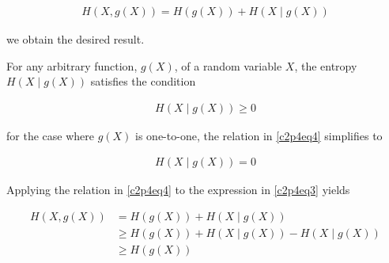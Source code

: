 \documentclass[ClusteringConnectionsMAIN.tex]{subfiles}
\begin{document}
\begin{align} \label{c2p4eq3}
H \left( X, g \left( X \right) \right) = H \left( g \left( X \right) \right) + H \left( X \mid g \left( X \right) \right)  \tag{2.4-3}
\end{align}

we obtain the desired result.



\vspace{0.5in}

  For any arbitrary function, $g \left( X \right)$, of a random variable $X$, the entropy $H \left( X \mid g \left( X \right)\right)$ satisfies the condition

\begin{align} \label{c2p4eq4}
H \left( X \mid g \left( X \right)\right) \geq 0  \tag{2.4-4}
\end{align}

for the case where $g \left( X \right)$ is one-to-one, the relation in \ref{c2p4eq4} simplifies to

\begin{align*}
H \left( X \mid g \left( X \right)\right) = 0
\end{align*}

Applying the relation in \ref{c2p4eq4} to the expression in \ref{c2p4eq3} yields

\begin{align*}
H \left( X, g \left( X \right) \right) &= H \left( g \left( X \right) \right) + H \left( X \mid g \left( X \right) \right) \\
&\geq H \left( g \left( X \right) \right) + H \left( X \mid g \left( X \right) \right) - H \left( X \mid g \left( X \right)\right) \\
&\geq H \left( g \left( X \right) \right)
\end{align*}
\end{document}
